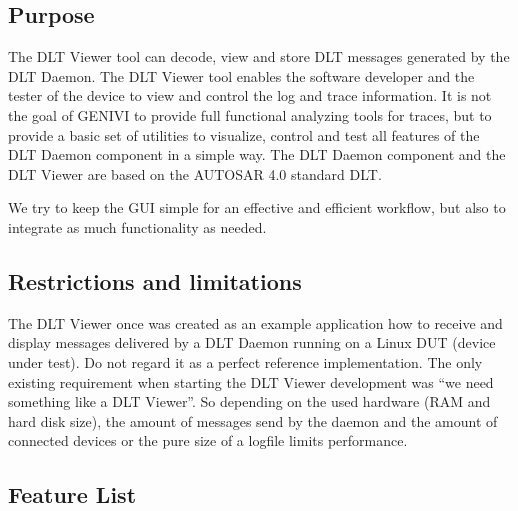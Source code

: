 \documentclass[a4paper,11pt]{article}
\begin{document}
\subsection{Purpose}


The DLT Viewer tool can decode, view and store DLT messages
generated by the DLT Daemon. The DLT Viewer tool enables the software developer and
the tester of the device to view and control the log and trace information. It is
not the goal of GENIVI to provide full functional analyzing tools for traces,
but to provide a basic set of utilities to visualize, control and test all features of the
DLT Daemon component in a simple way. The DLT Daemon component and the DLT Viewer
are based on the AUTOSAR 4.0 standard DLT.\@

We try to keep the GUI simple for an effective and efficient workflow, but also to
integrate as much functionality as needed.

\subsection{Restrictions and limitations}
The DLT Viewer once was created as an example application how to receive and display messages delivered by a DLT Daemon running on a
Linux DUT (device under test). Do not regard it as a perfect reference implementation.
The only existing requirement when starting the DLT Viewer development was ``we need something like a DLT Viewer''.
So depending on the used hardware (RAM and hard disk size), the amount of messages send by the daemon and the amount of connected
devices or the pure size of a logfile limits performance.


\subsection{Feature List}
\end{document}
